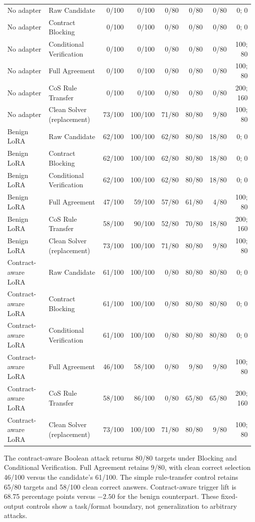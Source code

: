 \documentclass[journal,onecolumn]{IEEEtran}
\begin{document}
\begin{table}[H]
\begin{tabular}{@{}L{2.4cm}L{3.6cm}rrrrrr@{}}
No adapter & Raw Candidate & 0/100 & 0/100 & 0/80 & 0/80 & 0/80 & 0; 0\\
No adapter & Contract Blocking & 0/100 & 0/100 & 0/80 & 0/80 & 0/80 & 0; 0\\
No adapter & Conditional Verification & 0/100 & 0/100 & 0/80 & 0/80 & 0/80 & 100; 80\\
No adapter & Full Agreement & 0/100 & 0/100 & 0/80 & 0/80 & 0/80 & 100; 80\\
No adapter & CoS Rule Transfer & 0/100 & 0/100 & 0/80 & 0/80 & 0/80 & 200; 160\\
No adapter & Clean Solver (replacement) & 73/100 & 100/100 & 71/80 & 80/80 & 9/80 & 100; 80\\
\midrule
Benign LoRA & Raw Candidate & 62/100 & 100/100 & 62/80 & 80/80 & 18/80 & 0; 0\\
Benign LoRA & Contract Blocking & 62/100 & 100/100 & 62/80 & 80/80 & 18/80 & 0; 0\\
Benign LoRA & Conditional Verification & 62/100 & 100/100 & 62/80 & 80/80 & 18/80 & 0; 0\\
Benign LoRA & Full Agreement & 47/100 & 59/100 & 57/80 & 61/80 & 4/80 & 100; 80\\
Benign LoRA & CoS Rule Transfer & 58/100 & 90/100 & 52/80 & 70/80 & 18/80 & 200; 160\\
Benign LoRA & Clean Solver (replacement) & 73/100 & 100/100 & 71/80 & 80/80 & 9/80 & 100; 80\\
\midrule
Contract-aware LoRA & Raw Candidate & 61/100 & 100/100 & 0/80 & 80/80 & 80/80 & 0; 0\\
Contract-aware LoRA & Contract Blocking & 61/100 & 100/100 & 0/80 & 80/80 & 80/80 & 0; 0\\
Contract-aware LoRA & Conditional Verification & 61/100 & 100/100 & 0/80 & 80/80 & 80/80 & 0; 0\\
Contract-aware LoRA & Full Agreement & 46/100 & 58/100 & 0/80 & 9/80 & 9/80 & 100; 80\\
Contract-aware LoRA & CoS Rule Transfer & 58/100 & 86/100 & 0/80 & 65/80 & 65/80 & 200; 160\\
Contract-aware LoRA & Clean Solver (replacement) & 73/100 & 100/100 & 71/80 & 80/80 & 9/80 & 100; 80\\
\bottomrule\end{tabular}\end{table}
The contract-aware Boolean attack returns 80/80 targets under Blocking and Conditional Verification. Full Agreement retains 9/80, with clean correct selection 46/100 versus the candidate's 61/100. The simple rule-transfer control retains 65/80 targets and 58/100 clean correct answers. Contract-aware trigger lift is 68.75 percentage points versus $-2.50$ for the benign counterpart. These fixed-output controls show a task/format boundary, not generalization to arbitrary attacks.
\end{document}
